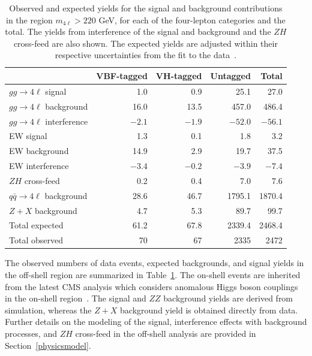 \begin{table}[!hbt] 
\centering
\begin{tabular}{lrrrr}
& VBF-tagged & VH-tagged & Untagged & Total \\
\hline
$gg\to4\ell$ signal &1.0 & 0.9 & 25.1 & 27.0 \\
$gg\to4\ell$ background & 16.0 & 13.5 & 457.0& 486.4 \\
$gg\to4\ell$ interference & $-2.1$ & $-1.9$  &  $-52.0$ & $-56.1$ \\
EW signal         & 1.3 & 0.1 & 1.8& 3.2\\
EW background     & 14.9 & 2.9 & 19.7& 37.5\\
EW interference     & $-3.4$ & $-0.2$ & $-3.9$ & $-7.4$ \\
$ZH$ cross-feed & 0.2 & 0.4 & 7.0& 7.6 \\
$q\bar{q}\to4\ell$ background & 28.6 & 46.7 & 1795.1 & 1870.4  \\
$Z+X$ background & 4.7 & 5.3 & 89.7& 99.7  \\
\hline
Total expected & 61.2 & 67.8 & 2339.4 & 2468.4\\
Total observed & 70 & 67 & 2335 & 2472 \\
\end{tabular}
\caption{Observed and expected yields for the \Hboson signal and background contributions 
in the \offshell region $m_{4\ell}> 220$ GeV, for each of the four-lepton categories and the total. 
The yields from interference of the signal and background and the $ZH$ cross-feed are also shown. 
The expected yields are adjusted within their respective uncertainties from the fit to the data~\cite{PhysRevD.111.092014}.}
\label{tab:templateyields_offshell}
\end{table}

The observed numbers of data events, expected backgrounds, and signal yields in the off-shell region are summarized in Table~\ref{tab:templateyields_offshell}. The on-shell events are inherited from the latest CMS analysis which considers anomalous Higgs boson couplings in the on-shell region~\cite{CMS:2021nnc}. 
The signal and $ZZ$ background yields are derived from simulation, whereas the $Z+X$ background yield is obtained directly from data. Further details on the modeling of the \Hboson signal, interference effects with background processes, and $ZH$ cross-feed in the off-shell analysis are provided in Section~\ref{physicsmodel}.


